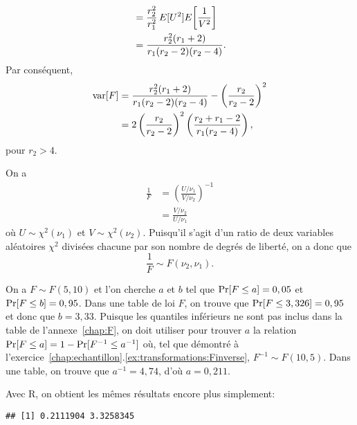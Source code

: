 \begin{solution}{2.13}
\begin{enumerate}
\begin{align*}
        &= \frac{r_2^2}{r_1^2}\, E [ U^2 ] E\! \left[ \frac{1}{V^2} \right] \\
        &= \frac{r_2^2 (r_1 + 2)}{r_1 (r_2 - 2)(r_2 - 4)}.
      \end{align*}
      Par conséquent,
      \begin{align*}
        \mathrm{var} [ F ]
        &= \frac{r_2^2 (r_1 + 2)}{r_1 (r_2 - 2)(r_2 - 4)} -
        \left(\frac{r_2}{r_2 - 2}\right)^2 \\
        &= 2 \left(\frac{r_2}{r_2 - 2}\right)^2
        \left(\frac{r_2 + r_1 - 2}{r_1 (r_2 - 4)}\right),
      \end{align*}
      pour $r_2 > 4$.
    \end{enumerate}
  
\end{solution}
\begin{solution}{2.14}
    On a
    \begin{align*}
      \frac{1}{F} &=
      \left(\frac{U/\nu_1}{V/\nu_2}\right)^{-1} \\
      &=\frac{V/\nu_2}{U/\nu_1}
    \end{align*}
    où $U \sim \chi^2(\nu_1)$ et $V \sim \chi^2(\nu_2)$. Puisqu'il s'agit
    d'un ratio de deux variables aléatoires $\chi^2$ divisées chacune
    par son nombre de degrés de liberté, on a donc que
    \begin{displaymath}
      \frac{1}{F} \sim F(\nu_2, \nu_1).
    \end{displaymath}
  
\end{solution}
\begin{solution}{2.15}
    On a $F \sim F(5, 10)$ et l'on cherche $a$ et $b$ tel que $\mathrm{Pr} [ F
      \leq a ] = 0,05$ et $\mathrm{Pr} [ F \leq b ] = 0,95$. Dans une table de
    loi $F$, on trouve que $\mathrm{Pr} [ F \leq 3,326 ] = 0,95$ et donc que $b
    = 3,33$. Puisque les quantiles inférieurs ne sont pas inclus dans
    la table de l'annexe~\ref{chap:F}, on doit utiliser pour trouver
    $a$ la relation $\mathrm{Pr} [ F \leq a ] = 1 - \mathrm{Pr} [ F^{-1} \leq a^{-1} ]$
    où, tel que démontré à
    l'exercice~\ref{chap:echantillon}.\ref{ex:transformations:Finverse},
    $F^{-1} \sim F(10, 5)$. Dans une table, on trouve que $a^{-1} =
    4,74$, d'où $a = 0,211$.

    Avec \textsf{R}, on obtient les mêmes résultats encore plus
    simplement:
\begin{knitrout}
\color{fgcolor}\begin{kframe}
\begin{alltt}
\hlstd{(}\hlstd{(}\hlstd{,} \hlstd{),} \hlstd{,} \hlstd{)}
\end{alltt}
\begin{verbatim}
## [1] 0.2111904 3.3258345
\end{verbatim}
\end{kframe}
\end{knitrout}
  
\end{solution}
